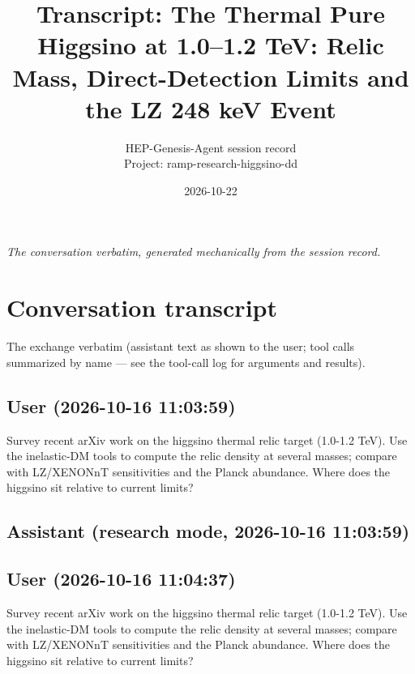 \documentclass[11pt,a4paper]{article}
\title{Transcript: The Thermal Pure Higgsino at 1.0--1.2 TeV: Relic Mass, Direct-Detection Limits and the LZ 248 keV Event}
\author{HEP-Genesis-Agent session record \\ \small Project: ramp-research-higgsino-dd}
\date{2026-10-22}
\begin{document}
\maketitle
\noindent\textit{\small The conversation verbatim, generated mechanically from the session record.}
\vspace{1em}



\appendix
\section{Conversation transcript}
\label{app:transcript}
The exchange verbatim (assistant text as shown to the user; tool calls summarized by name --- see the tool-call log for arguments and results).
\subsection*{User \small(2026-10-16 11:03:59)}
Survey recent arXiv work on the higgsino thermal relic target (1.0-1.2 TeV). Use the inelastic-DM tools to compute the relic density at several masses; compare with LZ/XENONnT sensitivities and the Planck abundance. Where does the higgsino sit relative to current limits?

\subsection*{Assistant \small(research mode, 2026-10-16 11:03:59)}
\subsection*{User \small(2026-10-16 11:04:37)}
Survey recent arXiv work on the higgsino thermal relic target (1.0-1.2 TeV). Use the inelastic-DM tools to compute the relic density at several masses; compare with LZ/XENONnT sensitivities and the Planck abundance. Where does the higgsino sit relative to current limits?
\end{document}
